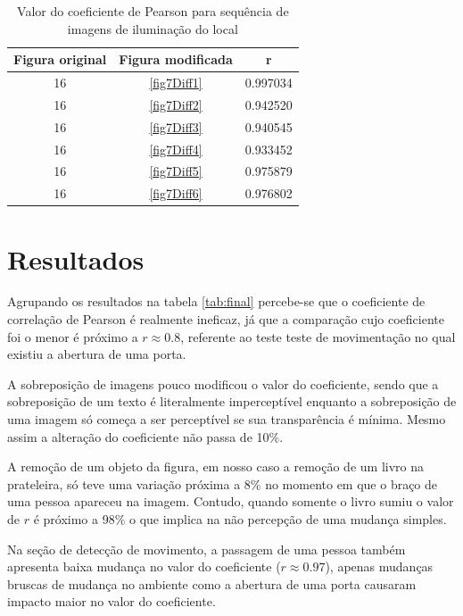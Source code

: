 \documentclass[10pt,a4paper]{article}
\begin{document}
\begin{table}[h!]
  \begin{center}
    \caption{Valor do coeficiente de Pearson para sequência de imagens
      de iluminação do local}
    \begin{tabular}{|c|c|c|}
      \hline
      Figura original & Figura modificada & r\\
      \hline
      16 &  \ref{fig7Diff1} & 0.997034\\
      16 &  \ref{fig7Diff2} & 0.942520\\
      16 &  \ref{fig7Diff3} & 0.940545\\
      16 &  \ref{fig7Diff4} & 0.933452\\
      16 &  \ref{fig7Diff5} & 0.975879\\
      16 &  \ref{fig7Diff6} & 0.976802\\
      \hline
    \end{tabular}
  \end{center}
\end{table}
\newpage
\section{Resultados}
Agrupando os resultados na tabela \ref{tab:final} percebe-se que o
coeficiente de correlação de Pearson é realmente ineficaz, já que a
comparação cujo coeficiente foi o menor é próximo a $r\approx 0.8$, referente
ao teste teste de movimentação no qual existiu a abertura de uma porta.

A sobreposição de imagens pouco modificou o valor do coeficiente,
sendo que a sobreposição de um texto é literalmente imperceptível
enquanto a sobreposição de uma imagem só começa a ser perceptível se
sua transparência é mínima. Mesmo assim a alteração do coeficiente não
passa de 10\%.

A remoção de um objeto da figura, em nosso caso a remoção de um livro
na prateleira, só teve uma variação próxima a 8\% no momento em que o
braço de uma pessoa apareceu na imagem. Contudo, quando somente o
livro sumiu o valor de $r$ é próximo a 98\% o que implica na não
percepção de uma mudança simples.

Na seção de detecção de movimento, a passagem de uma pessoa também
apresenta baixa mudança no valor do coeficiente ($r\approx 0.97$), apenas
mudanças bruscas de mudança no ambiente como a abertura de uma porta
causaram impacto maior no valor do coeficiente.
\end{document}
